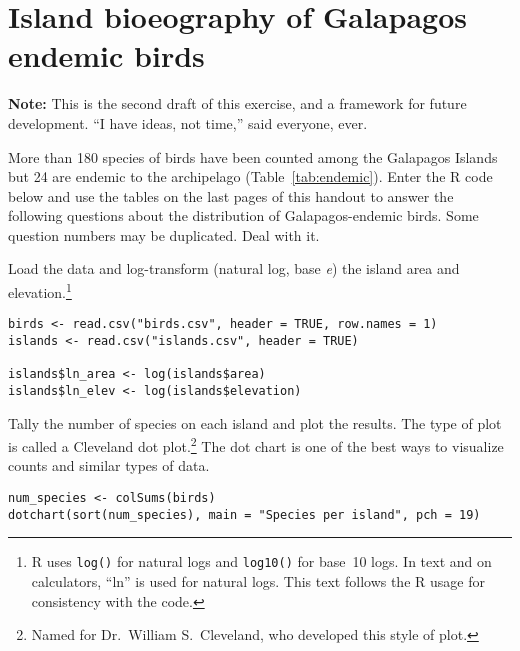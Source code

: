 \documentclass[11pt]{article}
\newcommand*{\assignmentTitle}{Island bioeography of Galapagos endemic birds}
\begin{document}
\thispagestyle{first_page}

\section*{\assignmentTitle}

\textbf{Note:} This is the second draft of this exercise, and a framework for future development. “I have ideas, not time,” said everyone, ever. 

More than 180 species of birds have been counted among the Galapagos Islands but 24 are endemic to the archipelago (Table~\ref{tab:endemic}). Enter the R code below and use the tables on the last pages of this handout to answer the following questions about the distribution of Galapagos-endemic birds. Some question numbers may be duplicated. Deal with it. 

Load the data and log-transform (natural log, base \emph{e}) the island area and elevation.\footnote{R uses \texttt{log()} for natural logs and \texttt{log10()} for base~10 logs. In text and on calculators, “ln” is used for natural logs. This text follows the R usage for consistency with the code.} 

{%
\begin{verbatim}
birds <- read.csv("birds.csv", header = TRUE, row.names = 1)
islands <- read.csv("islands.csv", header = TRUE)

islands$ln_area <- log(islands$area)
islands$ln_elev <- log(islands$elevation)
\end{verbatim}
}

Tally the number of species on each island and plot the results. The  type of plot is called a Cleveland dot plot.\footnote{Named for Dr.~William S.~Cleveland, who developed this style of plot.} The dot chart is one of the best ways to visualize counts and similar types of data.

{%
\begin{verbatim}
num_species <- colSums(birds) 
dotchart(sort(num_species), main = "Species per island", pch = 19)
\end{verbatim}
}
\end{document}

